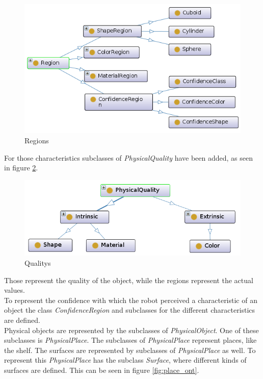 \documentclass[main.tex]{subfiles}
\begin{document}
\begin{figure}[H]
\centering
\includegraphics[width=1.0\textwidth]{pictures/ontology/Ontologie_region}
\caption{Regions}
\label{fig:region_ont}
\end{figure}

For those characteristics subclasses of \textit{PhysicalQuality} have been added, as seen in figure \ref{fig:quality_ont}.

\begin{figure}[H]
\centering
\includegraphics[width=1.0\textwidth]{pictures/ontology/Ontologie_quality}
\caption{Qualitys}
\label{fig:quality_ont}
\end{figure}

 Those represent the quality of the object, while the regions represent the actual values.\\
To represent the confidence with which the robot perceived a characteristic of an object the class \textit{ConfidenceRegion} and subclasses for the different characteristics are defined.\\
Physical objects are represented by the subclasses of \textit{PhysicalObject}.
One of these subclasses is \textit{PhysicalPlace}. The subclasses of \textit{PhysicalPlace} represent places, like the shelf. The surfaces are represented by subclasses of \textit{PhysicalPlace} as well. To represent this \textit{PhysicalPlace} has the subclass \textit{Surface}, where different kinds of surfaces are defined. This can be seen in figure \ref{fig:place_ont}.
\end{document}
